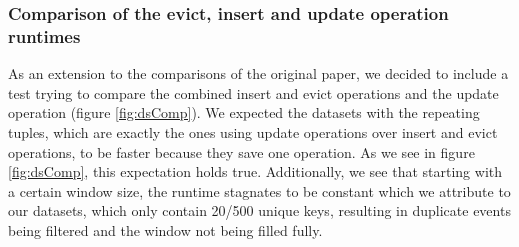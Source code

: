 \subsubsection{Comparison of the evict, insert and update operation runtimes}



As an extension to the comparisons of the original paper, we decided to include
a test trying to compare the combined insert and evict operations and the update
operation (figure \ref{fig:dsComp}). We expected the datasets with the repeating tuples,
which are exactly the ones using update operations over insert and evict operations,
to be faster because they save one operation. As we see in figure \ref{fig:dsComp}, this
expectation holds true. Additionally, we see that starting with a certain window size,
the runtime stagnates to be constant which we attribute to our datasets, which only
contain 20/500 unique keys, resulting in duplicate events being filtered and the window
not being filled fully.
